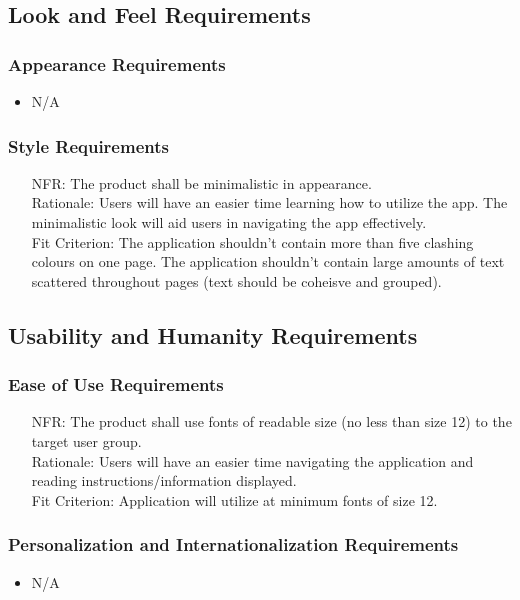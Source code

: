\documentclass[12pt]{article}
\newcounter{nfrnum} %
\begin{document}
\subsection{Look and Feel Requirements}
\subsubsection{Appearance Requirements}
\noindent \begin{itemize}
	\item N/A
\end{itemize}
\subsubsection{Style Requirements}
\noindent \begin{itemize}
	\item[NFR\refstepcounter{nfrnum}\thenfrnum:]
	The product shall be minimalistic in appearance.
	\\ Rationale:  Users will have an easier time learning how to utilize the app. The minimalistic look will aid users in navigating the app effectively.
	\\ Fit Criterion: The application shouldn't contain more than five clashing colours on one page. The application shouldn't contain large amounts of text scattered throughout pages (text should be coheisve and grouped).
\end{itemize}
\subsection{Usability and Humanity Requirements}
\subsubsection{Ease of Use Requirements}
\noindent \begin{itemize}
	\item[NFR\refstepcounter{nfrnum}\thenfrnum:]
	The product shall use fonts of readable size (no less than size 12) to the target user group.
	\\ Rationale: Users will have an easier time navigating the application and reading instructions/information displayed.
	\\ Fit Criterion: Application will utilize at minimum fonts of size 12.
\end{itemize}
\subsubsection{Personalization and Internationalization Requirements}
\noindent \begin{itemize}
	\item N/A
\end{itemize}
\end{document}

